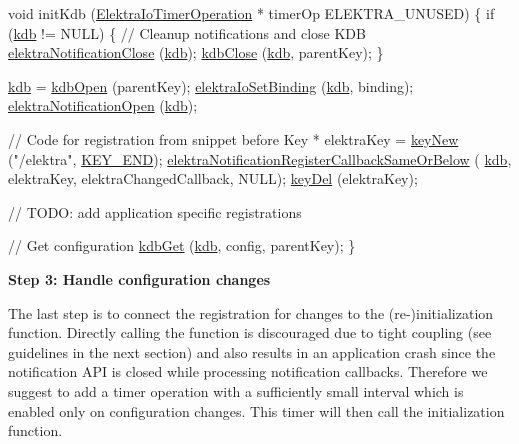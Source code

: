\begin{DoxyCode}
\textcolor{keywordtype}{void} initKdb (\hyperlink{kdbio_8h_a09c40c890207a8244fc39bb930fee1fa}{ElektraIoTimerOperation} * timerOp ELEKTRA\_UNUSED)
\{
        \textcolor{keywordflow}{if} (\hyperlink{namespacekdb}{kdb} != NULL)
        \{
                \textcolor{comment}{// Cleanup notifications and close KDB}
                \hyperlink{group__kdbnotification_ga5685dafbd4131011365628d6d9213594}{elektraNotificationClose} (\hyperlink{namespacekdb}{kdb});
                \hyperlink{group__kdb_gadb54dc9fda17ee07deb9444df745c96f}{kdbClose} (\hyperlink{namespacekdb}{kdb}, parentKey);
        \}

        \hyperlink{namespacekdb}{kdb} = \hyperlink{group__kdb_ga6808defe5870f328dd17910aacbdc6ca}{kdbOpen} (parentKey);
        \hyperlink{group__kdbio_ga187345483bdfbb404919c6797bc2db77}{elektraIoSetBinding} (\hyperlink{namespacekdb}{kdb}, binding);
        \hyperlink{group__kdbnotification_gaeae96154abdb5fdbf1b34a01e2b23e44}{elektraNotificationOpen} (\hyperlink{namespacekdb}{kdb});

        \textcolor{comment}{// Code for registration from snippet before}
        Key * elektraKey = \hyperlink{group__key_gad23c65b44bf48d773759e1f9a4d43b89}{keyNew} (\textcolor{stringliteral}{"/elektra"}, \hyperlink{group__key_gga91fb3178848bd682000958089abbaf40aa8adb6fcb92dec58fb19410eacfdd403}{KEY\_END});
        \hyperlink{group__kdbnotification_ga374edd4f4fff527d6511ce4d0df62681}{elektraNotificationRegisterCallbackSameOrBelow} (
      \hyperlink{namespacekdb}{kdb}, elektraKey, elektraChangedCallback, NULL);
        \hyperlink{group__key_ga3df95bbc2494e3e6703ece5639be5bb1}{keyDel} (elektraKey);

        \textcolor{comment}{// TODO: add application specific registrations}

        \textcolor{comment}{// Get configuration}
        \hyperlink{group__kdb_ga28e385fd9cb7ccfe0b2f1ed2f62453a1}{kdbGet} (\hyperlink{namespacekdb}{kdb}, config, parentKey);
\}
\end{DoxyCode}


{\bfseries Step 3\+: Handle configuration changes}

The last step is to connect the registration for changes to the (re-\/)initialization function. Directly calling the function is discouraged due to tight coupling (see guidelines in the next section) and also results in an application crash since the notification A\+PI is closed while processing notification callbacks. Therefore we suggest to add a timer operation with a sufficiently small interval which is enabled only on configuration changes. This timer will then call the initialization function.


